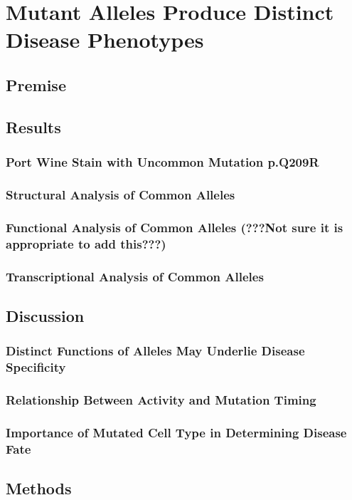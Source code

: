 \chapter{Mutant  Alleles Produce Distinct Disease Phenotypes}

\section{Premise}

\section{Results}
\subsection{Port Wine Stain with Uncommon Mutation  p.Q209R}
\subsection{Structural Analysis of Common  Alleles}
\subsection{Functional Analysis of Common  Alleles (???Not sure it is appropriate to add this???)}
\subsection{Transcriptional Analysis of Common  Alleles}

\section{Discussion}
\subsection{Distinct Functions of  Alleles May Underlie Disease Specificity}
\subsection{Relationship Between  Activity and Mutation Timing}
\subsection{Importance of Mutated Cell Type in Determining Disease Fate}

\section{Methods}

